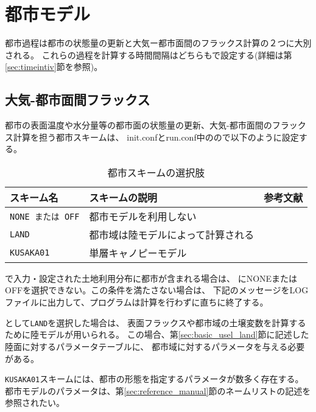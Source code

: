 \section{都市モデル} \label{sec:basic_usel_urban}
都市過程は都市の状態量の更新と大気ー都市面間のフラックス計算の２つに大別される。
これらの過程を計算する時間間隔はどちらもで設定する(詳細は第\ref{sec:timeintiv}節を参照)。

\subsection{大気-都市面間フラックス}
都市の表面温度や水分量等の都市面の状態量の更新、大気-都市面間のフラックス計算を担う都市スキームは、
init.confとrun.conf中のので以下のように設定する。


\begin{table}[h]
\begin{center}
  \caption{都市スキームの選択肢}
  \label{tab:nml_urban}
  \begin{tabularx}{150mm}{llX} \hline
    \rowcolor[gray]{0.9}  スキーム名  & スキームの説明 &  参考文献 \\ \hline
      \verb|NONE または OFF|   & 都市モデルを利用しない                      \\
      \verb|LAND|             & 都市域は陸モデルによって計算される            \\
      \verb|KUSAKA01|         & 単層キャノピーモデル  & \citet{kusaka_2001} \\
    \hline
  \end{tabularx}
\end{center}
\end{table}

で入力・設定された土地利用分布に都市が含まれる場合は、
にNONEまたはOFFを選択できない。この条件を満たさない場合は、
下記のメッセージをLOGファイルに出力して、プログラムは計算を行わずに直ちに終了する。
%

として\verb|LAND|を選択した場合は、
表面フラックスや都市域の土壌変数を計算するために陸モデルが用いられる。
この場合、第\ref{sec:basic_usel_land}節に記述した陸面に対するパラメータテーブルに、
都市域に対するパラメータを与える必要がある。

\verb|KUSAKA01|スキームには、都市の形態を指定するパラメータが数多く存在する。
都市モデルのパラメータは、第\ref{sec:reference_manual}節のネームリストの記述を参照されたい。
